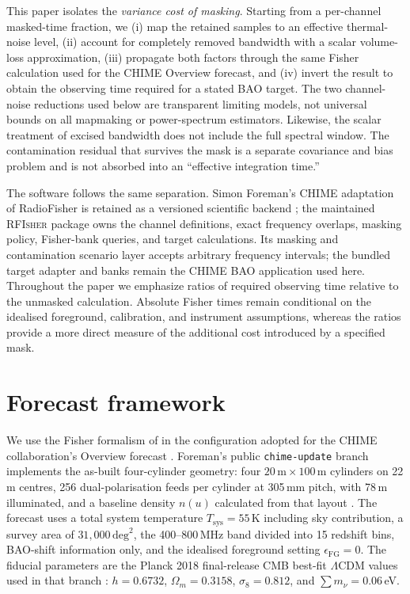 This paper isolates the \emph{variance cost of masking}. Starting from a
per-channel masked-time fraction, we (i) map the retained samples to an
effective thermal-noise level, (ii) account for completely removed
bandwidth with a scalar volume-loss approximation, (iii) propagate both
factors through the same Fisher calculation used for the CHIME Overview
forecast, and (iv) invert the result to obtain the observing time
required for a stated BAO target. The two channel-noise reductions used
below are transparent limiting models, not universal bounds on all
mapmaking or power-spectrum estimators. Likewise, the scalar treatment
of excised bandwidth does not include the full spectral window.
The contamination residual that survives the mask is a separate covariance and bias
problem and is not absorbed into an ``effective integration time.''

The software follows the same separation. Simon Foreman's CHIME
adaptation of RadioFisher is retained as a versioned scientific backend
\citep{Foreman2021,Bull2015}; the maintained \textsc{RFIsher} package
owns the channel definitions, exact frequency overlaps, masking policy,
Fisher-bank queries, and target calculations. Its masking and contamination
scenario layer accepts arbitrary frequency intervals; the bundled target
adapter and banks remain the CHIME BAO application used here. Throughout the
paper we emphasize ratios of required
observing time relative to the unmasked calculation. Absolute Fisher
times remain conditional on the idealised foreground, calibration, and
instrument assumptions, whereas the ratios provide a more direct measure
of the additional cost introduced by a specified mask.

\section{Forecast framework}
\label{sec:framework}

We use the Fisher formalism of \citet{Bull2015} in the configuration
adopted for the CHIME collaboration's Overview forecast
\citep[Appendix~A and Table~2]{CHIMEOverview2022}. Foreman's public
\texttt{chime-update} branch implements the as-built four-cylinder
geometry: four $20\,\mathrm{m}\times100\,\mathrm{m}$ cylinders on 22\,m
centres, 256 dual-polarisation feeds per cylinder at 305\,mm pitch, with
78\,m illuminated, and a baseline density $n(u)$ calculated from that
layout \citep{Foreman2021}. The forecast uses a total system temperature
$T_\mathrm{sys}=55$\,K including sky contribution, a survey area of
$31{,}000\,\mathrm{deg}^2$, the 400--800\,MHz band divided into 15
redshift bins, BAO-shift information only, and the idealised foreground
setting $\epsilon_\mathrm{FG}=0$. The fiducial parameters are the Planck
2018 final-release CMB best-fit $\Lambda$CDM values used in that branch
\citep{Planck2018}: $h=0.6732$, $\Omega_m=0.3158$, $\sigma_8=0.812$, and
$\sum m_\nu = 0.06$\,eV.

